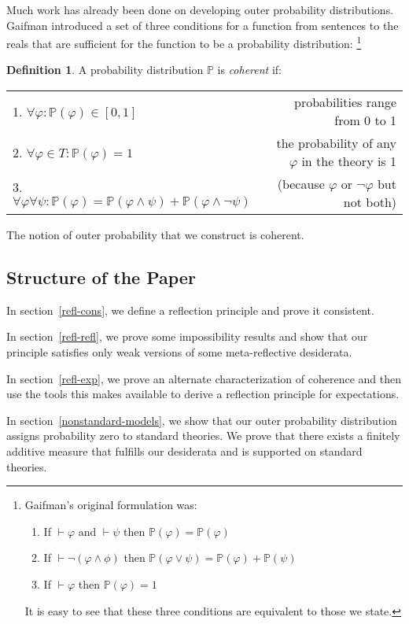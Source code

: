 \documentclass[12pt]{article}
\newcommand{\PP}{\mathbb{P}}
\newcommand{\vp}{\varphi}
\theoremstyle{plain}
\theoremstyle{definition}
\newtheorem{definition}[theorem]{Definition}
\theoremstyle{remark}
\begin{document}
Much work has already been done on developing outer probability distributions.
Gaifman\cite{gaifman64} introduced a set of three conditions for a function from sentences to the reals that are sufficient for the function to be a probability distribution:
\footnote{Gaifman's original formulation was:
\begin{enumerate}
\item If $\vdash \vp$ and $\vdash \psi$ then $\PP(\vp)=\PP(\vp)$
\item If $\vdash \neg (\vp \wedge \phi)$ then $\PP(\vp \vee \psi) = \PP(\vp) + \PP(\psi)$
\item If $\vdash \vp$ then $\PP(\vp) = 1$
\end{enumerate}
It is easy to see that these three conditions are equivalent to those we state.
}
\begin{definition} A probability distribution $\PP$ is \emph{coherent} if:
\begin{center}
\begin{tabular}{l r}
1. $\forall \vp: \PP(\vp) \in [0,1]$ & probabilities range from 0 to 1 \\
2. $\forall\vp\in T:\PP(\vp) = 1$ & the probability of any $\vp$ in the theory is 1 \\
3. $\forall \vp \forall \psi: \PP(\vp) = \PP(\vp \wedge \psi) + \PP(\vp \wedge \neg \psi)$ & (because $\vp$ or $\neg \vp$ but not both)
\end{tabular}
\end{center}
\end{definition}

The notion of outer probability that we construct is coherent.

\subsection{Structure of the Paper}
In section~\ref{refl-cons}, we define a reflection principle and prove it consistent. 

In section~\ref{refl-refl}, we prove some impossibility results and show that our principle satisfies only weak versions of some meta-reflective desiderata.

In section~\ref{refl-exp}, we prove %
an alternate characterization of coherence and then use the tools this makes available to derive a reflection principle for expectations.

In section~\ref{nonstandard-models}, we show that our outer probability distribution assigns probability zero to standard theories. We prove that there exists a finitely additive measure that fulfills our desiderata and is supported on standard theories. 
\end{document}
